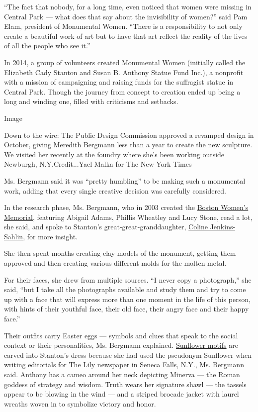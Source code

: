 ``The fact that nobody, for a long time, even noticed that women were
missing in Central Park --- what does that say about the invisibility of
women?'' said Pam Elam, president of Monumental Women. ``There is a
responsibility to not only create a beautiful work of art but to have
that art reflect the reality of the lives of all the people who see
it.''

In 2014, a group of volunteers created Monumental Women (initially
called the Elizabeth Cady Stanton and Susan B. Anthony Statue Fund
Inc.), a nonprofit with a mission of campaigning and raising funds for
the suffragist statue in Central Park. Though the journey from concept
to creation ended up being a long and winding one, filled with
criticisms and setbacks.

Image

Down to the wire: The Public Design Commission approved a revamped
design in October, giving Meredith Bergmann less than a year to create
the new sculpture. We visited her recently at the foundry where she's
been working outside Newburgh, N.Y.Credit...Yael Malka for The New York
Times

Ms. Bergmann said it was ``pretty humbling'' to be making such a
monumental work, adding that every single creative decision was
carefully considered.

In the research phase, Ms. Bergmann, who in 2003 created the
\href{https://www.boston.gov/departments/womens-advancement/boston-womens-memorial}{Boston
Women's Memorial}, featuring Abigail Adams, Phillis Wheatley and Lucy
Stone, read a lot, she said, and spoke to Stanton's
great-great-granddaughter,
\href{https://www.nytimes.com/2020/07/02/style/woman-suffrage-movement-descend.html}{Coline
Jenkins-Sahlin}, for more insight.

She then spent months creating clay models of the monument, getting them
approved and then creating various different molds for the molten metal.

For their faces, she drew from multiple sources. ``I never copy a
photograph,'' she said, ``but I take all the photographs available and
study them and try to come up with a face that will express more than
one moment in the life of this person, with hints of their youthful
face, their old face, their angry face and their happy face.''

Their outfits carry Easter eggs --- symbols and clues that speak to the
social context or their personalities, Ms. Bergmann explained.
\href{https://www.nps.gov/articles/symbols-of-the-women-s-suffrage-movement.htm}{Sunflower
motifs} are carved into Stanton's dress because she had used the
pseudonym Sunflower when writing editorials for The Lily newspaper in
Seneca Falls, N.Y., Ms. Bergmann said. Anthony has a cameo around her
neck depicting Minerva --- the Roman goddess of strategy and wisdom.
Truth wears her signature shawl --- the tassels appear to be blowing in
the wind --- and a striped brocade jacket with laurel wreaths woven in
to symbolize victory and honor.

